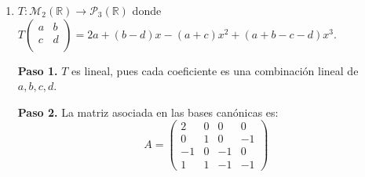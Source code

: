 \begin{prob}
\begin{enumerate}[$a)$]
\begin{myproof}
\textbf{Paso 2.} Si escribimos la matriz imagen como un vector columna,
\[
T\left(\begin{pmatrix}a\\b\\c\\d\end{pmatrix}\right) =
\begin{pmatrix}
a+b \\ 2d \\ 2b-d \\ -3c \\ 2b-c \\ -3a
\end{pmatrix},
\]
la matriz asociada es:
\[
A = \begin{pmatrix}
1 & 1 & 0 & 0 \\
0 & 0 & 0 & 2 \\
0 & 2 & 0 & -1 \\
0 & 0 & -3 & 0 \\
0 & 2 & -1 & 0 \\
-3 & 0 & 0 & 0
\end{pmatrix}
\]

\textbf{Paso 3.} La reducción por filas deja $4$ pivotes: como hay $4$ columnas, la nulidad es $0$ y el kernel es $\{0\}$.

\textbf{Paso 4.} La imagen es el subespacio de dimensión $4$ de $\mathbb{R}^6$ generado por las columnas de $A$. $\boxed{\operatorname{rang}(T)=4,\ \operatorname{nul}(T)=0}$
\end{myproof}

\item $T:\mathcal{M}_{2}\left(\mathbb{R}\right) \rightarrow \mathcal{P}_{3}(\mathbb{R})$  donde $T\left( \begin{array}{cc} 
	a&b \\
	c&d\\
	\end{array} \right)= 2a+(b-d)x-(a+c)x^2+(a+b-c-d)x^3.$
\begin{myproof}
\textbf{Paso 1.} $T$ es lineal, pues cada coeficiente es una combinación lineal de $a, b, c, d$.

\textbf{Paso 2.} La matriz asociada en las bases canónicas es:
\[
A = \begin{pmatrix}
2 & 0 & 0 & 0 \\
0 & 1 & 0 & -1 \\
-1 & 0 & -1 & 0 \\
1 & 1 & -1 & -1
\end{pmatrix}
\]


\end{myproof}
\end{enumerate}
\end{prob}
